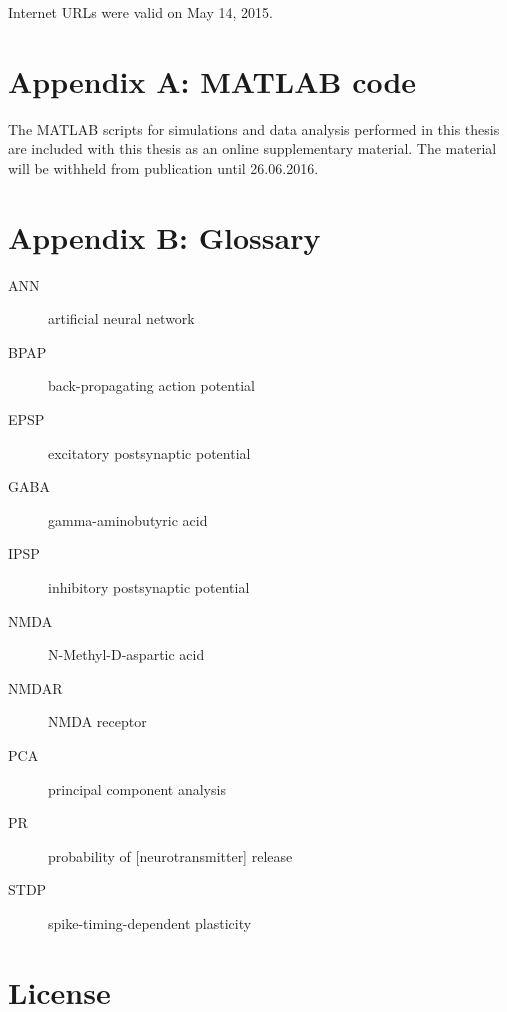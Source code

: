 \documentclass[a4paper,12pt]{report}
\theoremstyle{definition}
\begin{document}



Internet URLs were valid on May 14, 2015.
\newpage






\chapter*{Appendix A: MATLAB code}
\label{appendix:code}

The MATLAB scripts for simulations and data analysis performed in this thesis are included with this thesis as an online supplementary material. The material will be withheld from publication until 26.06.2016.







\chapter*{Appendix B: Glossary}
\label{appendix:glossary}

\begin{description}
  \item[ANN] artificial neural network
  \item[BPAP] back-propagating action potential
  \item[EPSP] excitatory postsynaptic potential
  \item[GABA] gamma-aminobutyric acid
  \item[IPSP] inhibitory postsynaptic potential
  \item[NMDA] N-Methyl-D-aspartic acid
  \item[NMDAR] NMDA receptor
  \item[PCA] principal component analysis
  \item[PR] probability of [neurotransmitter] release
  \item[STDP] spike-timing-dependent plasticity
\end{description}





\chapter*{License}
\end{document}

